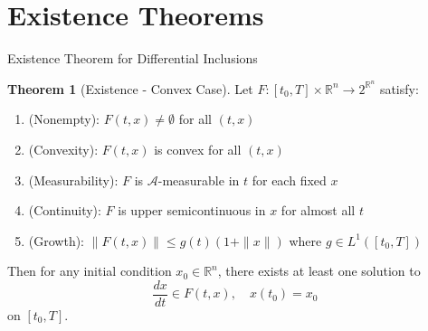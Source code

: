 \documentclass[aspectratio=169,10pt]{beamer}
\theoremstyle{definition}
\newtheorem{thm}{Theorem}[section]
\begin{document}
\section{Existence Theorems}

\begin{frame}{Existence Theorem for Differential Inclusions}

\begin{thm}[Existence - Convex Case]
Let $F: [t_0, T] \times \mathbb{R}^n \to 2^{\mathbb{R}^n}$ satisfy:
\begin{enumerate}
    \item (Nonempty): $F(t, x) \neq \emptyset$ for all $(t, x)$

    \item (Convexity): $F(t, x)$ is convex for all $(t, x)$

    \item (Measurability): $F$ is $\mathcal{A}$-measurable in $t$ for each fixed $x$

    \item (Continuity): $F$ is upper semicontinuous in $x$ for almost all $t$

    \item (Growth): $\|F(t, x)\| \leq g(t) (1 + \|x\|)$ where $g \in L^1([t_0, T])$
\end{enumerate}

Then for any initial condition $x_0 \in \mathbb{R}^n$, there exists at least one solution to
\[
\frac{dx}{dt} \in F(t, x), \quad x(t_0) = x_0
\]
on $[t_0, T]$.
\end{thm}

\end{frame}
\end{document}
